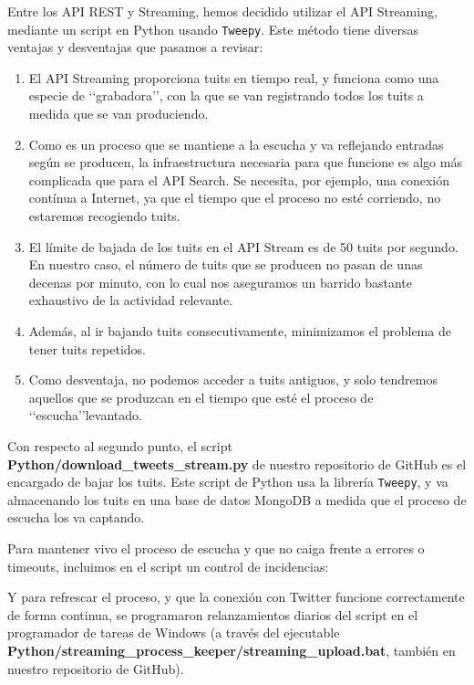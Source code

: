 Entre los API REST y Streaming, hemos decidido utilizar el API Streaming, mediante un script
en Python usando {\tt Tweepy}. Este método tiene diversas ventajas y desventajas que pasamos
a revisar:
\begin{enumerate}
\item El API Streaming proporciona tuits en tiempo real, y funciona como una especie de \lq\lq grabadora\rq\rq,
con la que se van registrando todos los tuits a medida que se van produciendo.
\item Como es un proceso que se mantiene a la escucha y va reflejando entradas según
se producen, la infraestructura necesaria para que funcione es algo  más complicada que para
el API Search. Se necesita, por ejemplo, una conexión contínua a Internet, ya que el tiempo que
el proceso no esté corriendo, no estaremos recogiendo tuits.
\item El límite de bajada de los tuits en el API Stream es de 50 tuits por segundo.
En nuestro caso, el número de tuits que se producen no pasan de unas decenas por minuto, con
lo cual nos aseguramos un barrido bastante exhaustivo de la actividad relevante.
\item Además, al ir bajando tuits consecutivamente, minimizamos el problema de tener tuits repetidos.
\item Como desventaja, no podemos acceder a tuits antiguos, y solo tendremos aquellos que 
se produzcan en el tiempo que esté el proceso de \lq\lq escucha\rq\rq levantado.
\end{enumerate}

Con respecto al segundo punto,  el script
{\bf Python/download\_tweets\_stream.py} de nuestro repositorio de GitHub
es el encargado de bajar los tuits. Este script de Python usa la librería {\tt Tweepy}, y 
va almacenando los tuits en una base de datos MongoDB a medida que el proceso de escucha los
va captando. 


Para mantener vivo el proceso de escucha y que no caiga frente a errores o timeouts,
incluimos en el script un control de incidencias:


Y para refrescar el proceso, y que la conexión con Twitter funcione correctamente
de forma continua, se programaron relanzamientos diarios del script en el programador 
de tareas de Windows (a través del ejecutable 
{\bf Python/streaming\_process\_keeper/streaming\_upload.bat}, también en nuestro 
repositorio de GitHub).
 
